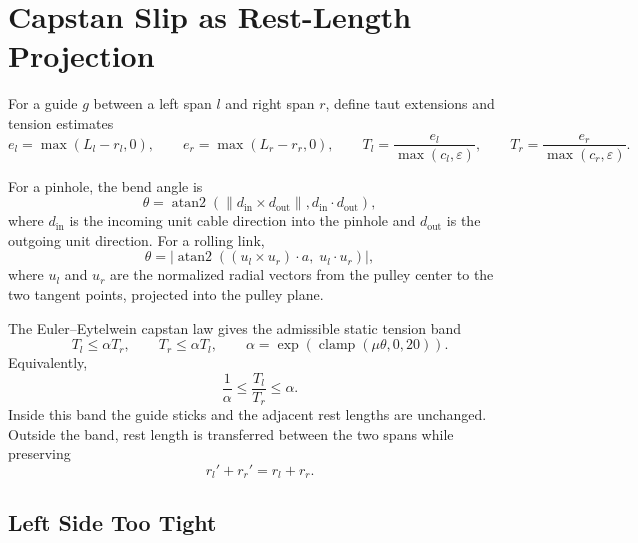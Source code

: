 \documentclass[11pt]{article}
\newcommand{\eps}{\varepsilon}
\newcommand{\clamp}{\operatorname{clamp}}
\begin{document}
\section{Capstan Slip as Rest-Length Projection}

For a guide $g$ between a left span $l$ and right span $r$, define taut
extensions and tension estimates
\begin{equation}
  e_l=\max(L_l-r_l,0),\qquad
  e_r=\max(L_r-r_r,0),\qquad
  T_l=\frac{e_l}{\max(c_l,\eps)},\qquad
  T_r=\frac{e_r}{\max(c_r,\eps)}.
  \label{eq:tension-estimate}
\end{equation}

For a pinhole, the bend angle is
\begin{equation}
  \theta =
  \operatorname{atan2}\!\left(
    \|d_\mathrm{in}\times d_\mathrm{out}\|,
    d_\mathrm{in}\cdot d_\mathrm{out}
  \right),
  \label{eq:pinhole-angle}
\end{equation}
where $d_\mathrm{in}$ is the incoming unit cable direction into the pinhole and
$d_\mathrm{out}$ is the outgoing unit direction.  For a rolling link,
\begin{equation}
  \theta =
  \left|
  \operatorname{atan2}\!\left(
    (u_l\times u_r)\cdot a,\; u_l\cdot u_r
  \right)
  \right|,
  \label{eq:rolling-angle}
\end{equation}
where $u_l$ and $u_r$ are the normalized radial vectors from the pulley center
to the two tangent points, projected into the pulley plane.

The Euler--Eytelwein capstan law gives the admissible static tension band
\begin{equation}
  T_l \le \alpha T_r,\qquad
  T_r \le \alpha T_l,\qquad
  \alpha=\exp(\clamp(\mu\theta,0,20)).
  \label{eq:capstan-band}
\end{equation}
Equivalently,
\begin{equation}
  \frac{1}{\alpha}\le\frac{T_l}{T_r}\le\alpha.
\end{equation}
Inside this band the guide sticks and the adjacent rest lengths are unchanged.
Outside the band, rest length is transferred between the two spans while
preserving
\begin{equation}
  r_l' + r_r' = r_l+r_r.
  \label{eq:rest-conservation}
\end{equation}

\subsection{Left Side Too Tight}
\end{document}
